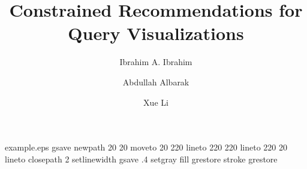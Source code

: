 %
%
%
%
%
\begin{filecontents*}{example.eps}
gsave
newpath
  20 20 moveto
  20 220 lineto
  220 220 lineto
  220 20 lineto
closepath
2 setlinewidth
gsave
  .4 setgray fill
grestore
stroke
grestore
\end{filecontents*}
%
\RequirePackage{fix-cm}
%
\documentclass[smallextended]{svjour3}       %
%
\smartqed  %
%
\usepackage{graphicx}
\usepackage[ruled,vlined]{algorithm2e}
\usepackage{subcaption} 
\usepackage{amsmath}
\usepackage{hyperref}
%
%
%
%
%


\title{Constrained Recommendations for Query Visualizations%
}


\author{Ibrahim A. Ibrahim         \and
        Abdullah Albarak \and %
				Xue Li
}

